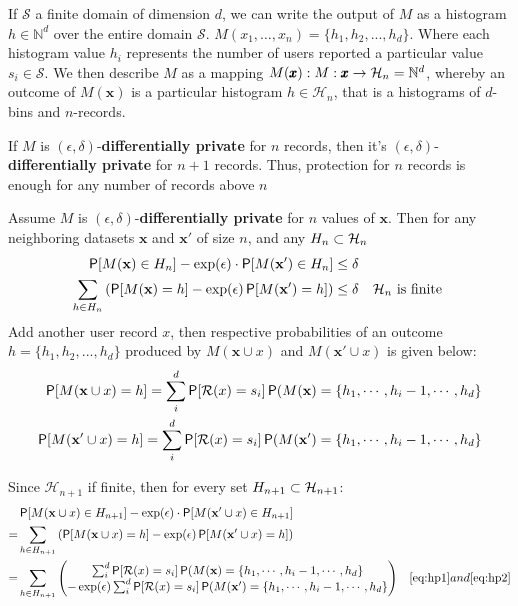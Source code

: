 \documentclass[11pt]{article}
\newcommand{\bbx}{\pmb{x}}
\newcommand{\cR}{\mathcal{R}}
\newcommand{\N}{\mathbb{N}}
\newcommand{\Ssp}{\mathcal{S}}
\newcommand{\Hsp}{\mathcal{H}}
\newcommand{\xv}{\mathbf{x}}
\begin{document}
If $\Ssp$ a finite domain of dimension $d$,  we can write the output of $M$ as a histogram $h \in \N^d$ over the entire domain $\Ssp$.   $M(x_1,  \dots , x_n) = \{h_1, h_2, ..., h_d\}$. Where each histogram value $h_i$ represents the number of users reported a particular value $s_i \in  \Ssp$.   We then describe $M$ as a mapping $M(\bbx):\map{M}{\bbx}{\Hsp_n = \N^d}$, whereby an outcome of $M(\bbx)$ is a particular histogram $h \in \Hsp_n$, that is a histograms of $d$-bins and $n$-records.

\begin{prop} \label{prop:nprot} If $M$ is $(\epsilon,\delta)$-\textbf{differentially private} for $n$ records, then it's $(\epsilon,\delta)$-\textbf{differentially private} for $n+1$ records. Thus, protection for $n$ records is enough for any number of records above $n$

Assume  $M$ is  $(\epsilon,\delta)$-\textbf{differentially private} for $n$ values of $\bbx$. Then for any neighboring datasets $\bbx$ and $\bbx'$ of size $n$, and any $H_n \cont \Hsp_n$
 \begin{align}
 \P[M(\xv) \in H_n] - \exp(\epsilon) \cdot \P[M(\xv') \in H_n]  \le \delta &  & \\
 \sum_{h \in H_n} \left ( \P[M(\xv) = h] -  \exp(\epsilon)  \P[M(\xv') = h]  \right )  \le \delta  &  & \Hsp_n \text{ is finite }  \label{eq:histdiff}
\end{align}
Add another user record $x$, then respective probabilities of an outcome $h=\{h_1, h_2, ..., h_d\}$ produced by $M(\xv \cup x)$ and $M(\xv' \cup x)$ is given below:
 \begin{align}
\P[M(\xv \cup x) = h] = \sum^d_i \P[\cR(x) = s_i]\P(M(\xv) = \{h_1 , \cdots ,h_i -1, \cdots, h_d \} \label{eq:hp1} \\
\P[M(\xv' \cup x) = h] = \sum^d_i \P[\cR(x) = s_i]\P(M(\xv') = \{h_1 , \cdots ,h_i -1, \cdots, h_d \} \label{eq:hp2}
\end{align}

Since $ \Hsp_{n+1}$ if finite, then for every set $H_{n+1} \cont  \Hsp_{n+1}$:
 \begin{align*}
 & \P[M(\xv \cup x) \in H_{n+1}] - \exp(\epsilon) \cdot \P[M(\xv' \cup x) \in H_{n+1}]  & \\
 = & \sum_{h \in H_{n+1}} \left ( \P[M(\xv \cup x) = h] -  \exp(\epsilon)  \P[M(\xv' \cup x) = h]  \right )  & \\
 =  & \sum_{h \in H_{n+1}}   \left (    \begin{matrix}
\sum^d_i \P[\cR(x) = s_i]\P(M(\xv) = \{h_1 , \cdots ,h_i -1, \cdots, h_d \}  \\ 
 -  \exp(\epsilon)\sum^d_i \P[\cR(x) = s_i]\P(M(\xv') = \{h_1 , \cdots ,h_i -1, \cdots, h_d \}   
\end{matrix}
  \right) &  \eqref{eq:hp1}  and  \eqref{eq:hp2} 
\end{align*}


\end{prop}
\end{document}
